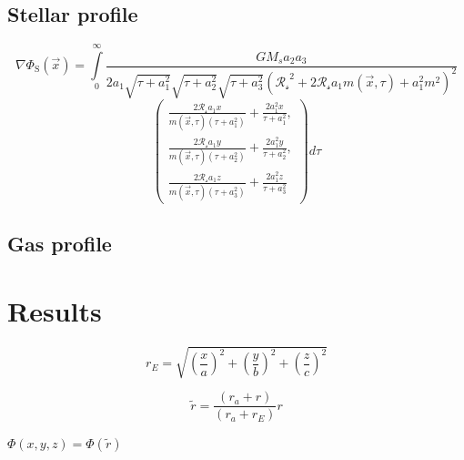 	\subsection{Stellar profile}
	\begin{equation*}
		\nabla \Phi_\text{S}(\vec{x}) = \int\limits_{0}^{\infty}\dfrac{G M_{s} a_{2} a_{3} }{2 a_{1} \sqrt{\tau + a_{1}^{2}} \sqrt{\tau + a_{2}^{2}} \sqrt{\tau + a_{3}^{2}} \left(\mathcal{R_s}^{2} + 2 \mathcal{R_s} a_{1} m(\vec{x}, \tau)+ a_{1}^{2} m^{2}\right)^{2}}
	\end{equation*}
	\begin{equation}
		\left(\begin{array}{l}
		\frac{2 \mathcal{R_s} a_{1} x}{m(\vec{x}, \tau)\left(\tau + a_{1}^{2}\right)} + \frac{2 a_{1}^{2} x}{\tau + a_{1}^{2}}, \\
		\frac{2 \mathcal{R_s} a_{1} y}{m(\vec{x}, \tau)\left(\tau + a_{2}^{2}\right)} + \frac{2 a_{1}^{2} y}{\tau + a_{2}^{2}}, \\
		\frac{2 \mathcal{R_s} a_{1} z}{m(\vec{x}, \tau)\left(\tau + a_{3}^{2}\right)} + \frac{2 a_{1}^{2} z}{\tau + a_{3}^{2}}
		\end{array}\right)
		d\tau
	\end{equation}
	\subsection{Gas profile}
	
	\section{Results}
		

	\begin{equation}
		r_E = \sqrt{\left(\dfrac{x}{a}\right)^2 + \left(\dfrac{y}{b}\right)^2 + \left(\dfrac{z}{c}\right)^2}
	\end{equation}
	
	\begin{equation}
		\tilde{r} = \dfrac{(r_a + r)}{(r_a + r_E)}r
	\end{equation}
	
	$\Phi(x, y, z) = \Phi(\tilde{r})$ \cite{vogelsberger2008fine}